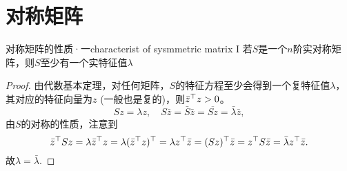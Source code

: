 \section{对称矩阵}
\begin{theorem}{对称矩阵的性质·一}{characterist of sysmmetric matrix I}
	若$S$是一个$n$阶实对称矩阵，则$S$至少有一个实特征值$\lambda$
\end{theorem}
\begin{proof}
	由代数基本定理，对任何矩阵，$S$的特征方程至少会得到一个复特征值$\lambda$，其对应的特征向量为$z$ (一般也是复的)，则$\bar z^\top z>0$。
	\[
		Sz=\lambda z,\quad S\bar z=\bar S\bar z=\overline{Sz}=\bar\lambda\bar z,
	\]
	由$S$的对称的性质，注意到
	\[
		\bar z^\top Sz=\lambda\bar z^\top z=\lambda(\bar z^\top z)^\top=\lambda z^\top\bar z=(Sz)^\top\bar z=z^\top S\bar z=\bar\lambda z^\top\bar z.
	\]
	故$\lambda=\bar\lambda$.
\end{proof}

